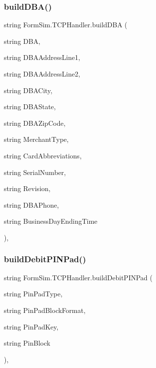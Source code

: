 \subsubsection{\texorpdfstring{build\+D\+B\+A()}{buildDBA()}}
{\footnotesize\ttfamily string Form\+Sim.\+T\+C\+P\+Handler.\+build\+D\+BA (\begin{DoxyParamCaption}\item[{string}]{D\+BA,  }\item[{string}]{D\+B\+A\+Address\+Line1,  }\item[{string}]{D\+B\+A\+Address\+Line2,  }\item[{string}]{D\+B\+A\+City,  }\item[{string}]{D\+B\+A\+State,  }\item[{string}]{D\+B\+A\+Zip\+Code,  }\item[{string}]{Merchant\+Type,  }\item[{string}]{Card\+Abbreviations,  }\item[{string}]{Serial\+Number,  }\item[{string}]{Revision,  }\item[{string}]{D\+B\+A\+Phone,  }\item[{string}]{Business\+Day\+Ending\+Time }\end{DoxyParamCaption})\hspace{0.3cm}{\ttfamily [inline]}, {\ttfamily [private]}}

\mbox{\label{class_form_sim_1_1_t_c_p_handler_aed895ee0544cd2dde70e21f36e6f4dea}} 
\subsubsection{\texorpdfstring{build\+Debit\+P\+I\+N\+Pad()}{buildDebitPINPad()}}
{\footnotesize\ttfamily string Form\+Sim.\+T\+C\+P\+Handler.\+build\+Debit\+P\+I\+N\+Pad (\begin{DoxyParamCaption}\item[{string}]{Pin\+Pad\+Type,  }\item[{string}]{Pin\+Pad\+Block\+Format,  }\item[{string}]{Pin\+Pad\+Key,  }\item[{string}]{Pin\+Block }\end{DoxyParamCaption})\hspace{0.3cm}{\ttfamily [inline]}, {\ttfamily [private]}}

